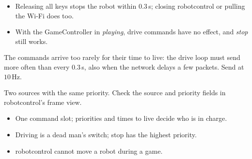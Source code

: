 \begin{checkbox}
\begin{itemize}[nosep]
  \item Releasing all keys stops the robot within $0.3$\,s; closing robotcontrol or pulling the Wi-Fi does too.
  \item With the GameController in \emph{playing}, drive commands have no effect, and \emph{stop} still works.
\end{itemize}
\end{checkbox}

\begin{troublebox}
\begin{description}[leftmargin=0.6cm,nosep]
  \item[The robot stutters while a key is held] The commands arrive too rarely for their time to live: the drive loop must send more often than every $0.3$\,s, also when the network delays a few packets. Send at $10$\,Hz.
  \item[Cognition and robotcontrol ``fight''] Two sources with the same priority. Check the source and priority fields in robotcontrol's frame view.
\end{description}
\end{troublebox}

\begin{keyidea}
\begin{itemize}[nosep]
  \item One command slot; priorities and times to live decide who is in charge.
  \item Driving is a dead man's switch; stop has the highest priority.
  \item robotcontrol cannot move a robot during a game.
\end{itemize}
\end{keyidea}
